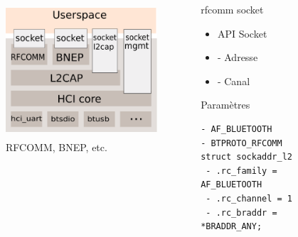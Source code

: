 \begin{frame}[fragile]
\begin{columns}[t]
\begin{column}{0.60\linewidth}
	\begin{figure}
		\includegraphics[height=5cm]{img/bluez_kernel.png}
		\caption{RFCOMM, BNEP, etc.}
	\end{figure}
\end{column}
\begin{column}{0.40\linewidth}
	\begin{block}{rfcomm socket}
		\begin{itemize}
			\item API Socket
			\item - Adresse
			\item - Canal
		\end{itemize}
	\end{block}
	\begin{block}{Paramètres}
		\begin{Verbatim}[fontsize=\tiny]
- AF_BLUETOOTH
- BTPROTO_RFCOMM
struct sockaddr_l2
 - .rc_family = AF_BLUETOOTH
 - .rc_channel = 1
 - .rc_braddr = *BRADDR_ANY;
		\end{Verbatim}
	\end{block}

\end{column}
\end{columns}
\end{frame}

